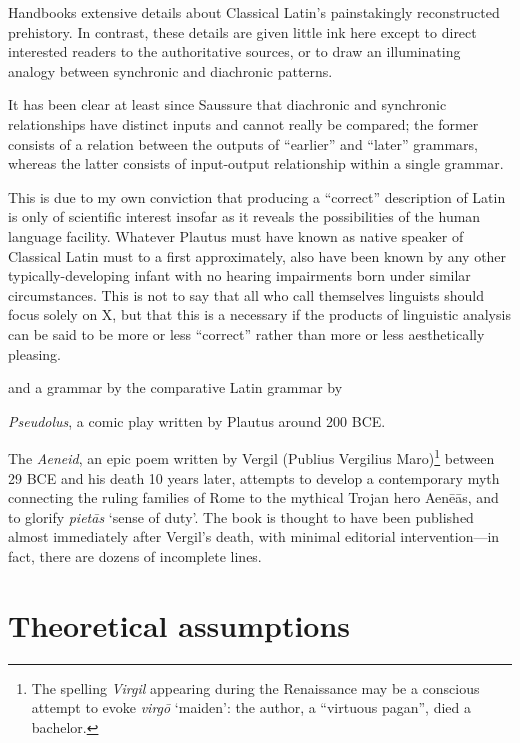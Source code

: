Handbooks extensive details about Classical Latin's painstakingly reconstructed prehistory.
In contrast, these details are given little ink here except to direct interested readers to the authoritative sources, or to draw an illuminating analogy between synchronic and diachronic patterns.



It has been clear at least since Saussure that diachronic and synchronic relationships have distinct inputs and cannot really be compared; the former consists of a relation between the outputs of ``earlier'' and ``later'' grammars, whereas the latter consists of input-output relationship within a single grammar.

This is due to my own conviction that producing a ``correct'' description of Latin is only of scientific interest insofar as it reveals the possibilities of the human language facility.
Whatever Plautus must have known as native speaker of Classical Latin must to a first approximately, also have been known by any other typically-developing infant with no hearing impairments born under similar circumstances.
This is not to say that all who call themselves linguists should focus solely on X, but that this is a necessary if the products of linguistic analysis can be said to be more or less ``correct'' rather than more or less aesthetically pleasing.

and a grammar by \citet{Sommer1902}
the comparative Latin grammar by \citet{Sihler1995}

\emph{Pseudolus}, a comic play written by Plautus around 200 BCE.

The \emph{Aeneid}, an epic poem written by Vergil (Publius Vergilius Maro)\footnote{
    The spelling \emph{Virgil} appearing during the Renaissance may be a conscious attempt to evoke \emph{virgō} `maiden': the author, a ``virtuous pagan'', died a bachelor.}
between 29 BCE and his death 10 years later, attempts to develop a contemporary myth connecting the ruling families of Rome to the mythical Trojan hero Aenēās, and to glorify \emph{pietās} `sense of duty'.
The book is thought to have been published almost immediately after Vergil's death, with minimal editorial intervention---in fact, there are dozens of incomplete lines.

\section{Theoretical assumptions}

